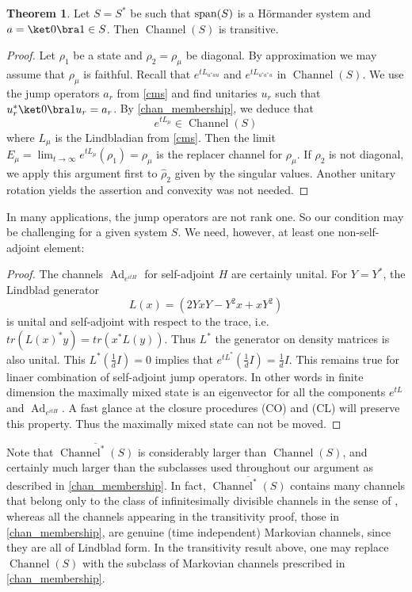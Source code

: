 \documentclass[11pt,reqno]{amsart}
\theoremstyle{definition}
\newtheorem{theorem}{Theorem}[section]
\newtheorem{proposition}[theorem]{Proposition}
\DeclareMathOperator{\Ad}{Ad}
\DeclareMathOperator{\chan}{Channel}
\begin{document}
\begin{theorem} \label{trans1}
    Let $S=S^*$ be such that ${\rm span}(S)$ is a H\"ormander system and $a=\ket 0\bra 1\in S$. Then $\chan(S)$ is transitive. 
\end{theorem}

\begin{proof}
    Let $\rho_1$ be a state and $\rho_2=\rho_{\mu}$ be diagonal. By approximation we may assume that $\rho_{\mu}$ is faithful.  Recall that $e^{tL_{u^*au}}$ and $e^{tL_{u^*a^*u}}$ in $\chan(S)$. We use the jump operators $a_r$ from \cref{cms} and find unitaries $u_r$ such that $u_r^*\ket 0\bra 1u_r=a_r$. By \cref{chan_membership}, we deduce that 
    \[ e^{tL_{\mu}} \in \chan(S) \] 
    where $L_{\mu}$ is the Lindbladian from \cref{cms}. Then the limit $E_{\mu}=\lim_{t\to \infty} e^{tL_{\mu}}(\rho_1)=\rho_{\mu}$ is the replacer channel for $\rho_{\mu}$.  If $\rho_2$ is not diagonal, we apply this argument first to $\hat{\rho}_2$ given by the singular values. Another unitary rotation yields the assertion and convexity was not needed.  
\end{proof}

In many applications, the jump operators are not rank one. So our condition may be challenging for a given system $S$. We need, however, at least one non-self-adjoint element: 

\begin{proof}
    The channels $\Ad_{e^{itH}}$ for self-adjoint $H$  are certainly unital. For $Y=Y^*$, the Lindblad generator
    \[ L(x) = (2YxY-Y^2x+xY^2)\] 
    is unital and self-adjoint with respect to the trace, i.e. $tr(L(x)^*y)=tr(x^*L(y))$. Thus $L^*$ the generator on density matrices is also unital. This $L^*(\frac{1}{d}I)=0$ implies that $e^{tL^*}(\frac{1}{d}I)=\frac{1}{d}I$. This remains true for linaer combination of self-adjoint jump operators.  In other words in finite dimension the maximally mixed state is an eigenvector for all the components $e^{tL}$ and $\Ad_{e^{itH}}$. A fast glance at the closure procedures (CO) and (CL) will preserve this property. Thus the maximally mixed state can not be moved.     
\end{proof}
Note that $\overline{\chan^*(S)}$ is considerably larger than $\chan(S)$, and certainly much larger than the subclasses used throughout our argument as described in \cref{chan_membership}. In fact, $\overline{\chan^*(S)}$ contains many channels that belong only to the class of infinitesimally divisible channels in the sense of \cite{wolf_cirac}, whereas all the channels appearing in the transitivity proof, those in \cref{chan_membership}, are genuine (time independent) Markovian channels, since they are all of Lindblad form. In the transitivity result above, one may replace $\chan(S)$ with the subclass of Markovian channels prescribed in \cref{chan_membership}.
\end{document}
